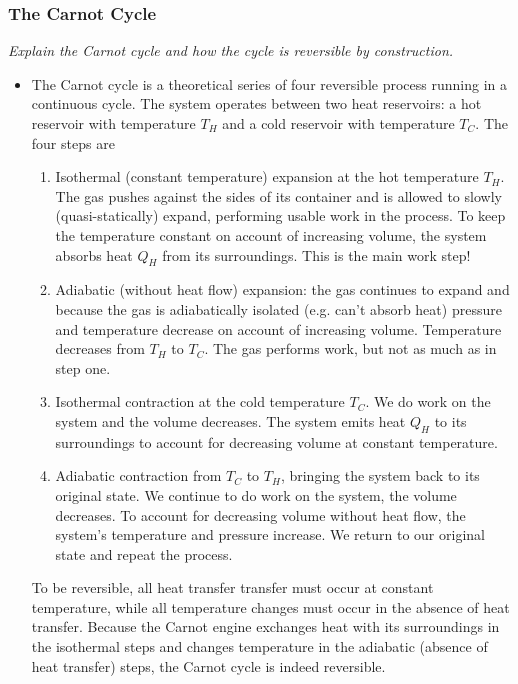 \documentclass[11pt, a4paper]{article}
\begin{document}
\subsubsection{The Carnot Cycle}
\textit{Explain the Carnot cycle and how the cycle is reversible by construction.}
\begin{itemize}
	\item The Carnot cycle is a theoretical series of four reversible process running in a continuous cycle. The system operates between two heat reservoirs: a hot reservoir with temperature $ T_{H} $ and a cold reservoir with temperature $ T_{C} $. The four steps are
	\begin{enumerate}
		\item Isothermal (constant temperature) expansion at the hot temperature $ T_{H} $. The gas pushes against the sides of its container and is allowed to slowly (quasi-statically) expand, performing usable work in the process. To keep the temperature constant on account of increasing volume, the system absorbs heat $ Q_{H} $ from its surroundings. This is the main work step!
		
		\item Adiabatic (without heat flow) expansion: the gas continues to expand and because the gas is adiabatically isolated (e.g. can't absorb heat) pressure and temperature decrease on account of increasing volume. Temperature decreases from $ T_{H} $ to $ T_{C} $. The gas performs work, but not as much as in step one.
		
		\item Isothermal contraction at the cold temperature $ T_{C} $. We do work on the system and the volume decreases. The system emits heat $ Q_{H} $ to its surroundings to account for decreasing volume at constant temperature.
		
		\item Adiabatic contraction from $ T_{C} $ to $ T_{H} $, bringing the system back to its original state. We continue to do work on the system, the volume decreases. To account for decreasing volume without heat flow, the system's temperature and pressure increase. We return to our original state and repeat the process.
	\end{enumerate}
	To be reversible, all heat transfer transfer must occur at constant temperature, while all temperature changes must occur in the absence of heat transfer. Because the Carnot engine exchanges heat with its surroundings in the isothermal steps and changes temperature in the adiabatic (absence of heat transfer) steps, the Carnot cycle is indeed reversible.


\end{itemize}
\end{document}

